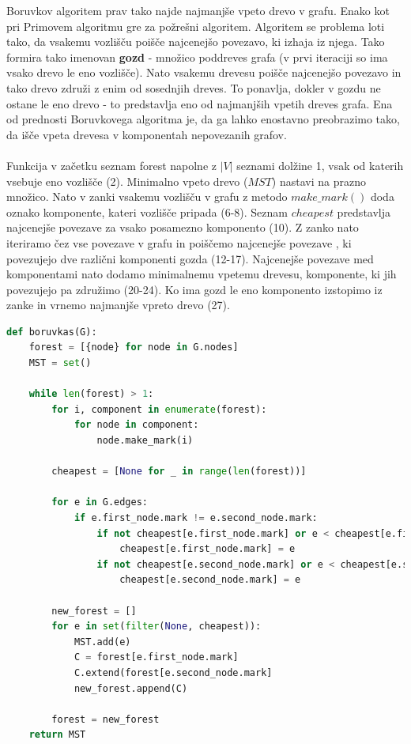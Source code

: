 \documentclass[11pt]{article}
\begin{document}
Boruvkov algoritem prav tako najde najmanjše vpeto drevo v grafu. Enako kot pri Primovem algoritmu gre za požrešni algoritem. Algoritem se problema loti tako, da vsakemu vozlišču poišče najcenejšo povezavo, ki izhaja iz njega. Tako formira tako imenovan \textbf{gozd} - množico poddreves grafa (v prvi iteraciji so ima vsako drevo le eno vozlišče). Nato vsakemu drevesu poišče najcenejšo povezavo in tako drevo združi z enim od sosednjih dreves. To ponavlja, dokler v gozdu ne ostane le eno drevo - to predstavlja eno od najmanjših vpetih dreves grafa. Ena od prednosti Boruvkovega algoritma je, da ga lahko enostavno preobrazimo tako, da išče vpeta drevesa v komponentah nepovezanih grafov.
\\ \\
Funkcija v začetku seznam forest napolne z  $\vert V \vert $ seznami dolžine 1, vsak od katerih vsebuje eno vozlišče (2). Minimalno vpeto drevo ($MST$) nastavi na prazno množico. Nato v zanki vsakemu vozlišču v grafu z metodo $make\_mark()$ doda oznako komponente, kateri vozlišče pripada (6-8). Seznam $cheapest$ predstavlja najcenejše povezave za vsako posamezno komponento (10). Z zanko nato iteriramo čez vse povezave v grafu in poiščemo najcenejše povezave , ki povezujejo dve različni komponenti gozda (12-17). Najcenejše povezave med komponentami nato dodamo minimalnemu vpetemu drevesu, komponente, ki jih povezujejo pa združimo (20-24). Ko ima gozd le eno komponento izstopimo iz zanke in vrnemo najmanjše vpreto drevo (27). \cite{boruvkas}


\begin{lstlisting}[language=Python, caption=Boruvkov algoritem]
def boruvkas(G):
    forest = [{node} for node in G.nodes]
    MST = set()
    
    while len(forest) > 1:
        for i, component in enumerate(forest):
            for node in component:
                node.make_mark(i)
        
        cheapest = [None for _ in range(len(forest))]
        
        for e in G.edges:
            if e.first_node.mark != e.second_node.mark:
                if not cheapest[e.first_node.mark] or e < cheapest[e.first_node.mark]:
                    cheapest[e.first_node.mark] = e
                if not cheapest[e.second_node.mark] or e < cheapest[e.second_node.mark]:
                    cheapest[e.second_node.mark] = e
        
        new_forest = []
        for e in set(filter(None, cheapest)):
            MST.add(e)            
            C = forest[e.first_node.mark]
            C.extend(forest[e.second_node.mark]          
            new_forest.append(C)
            
        forest = new_forest
    return MST

\end{lstlisting}
\end{document}
